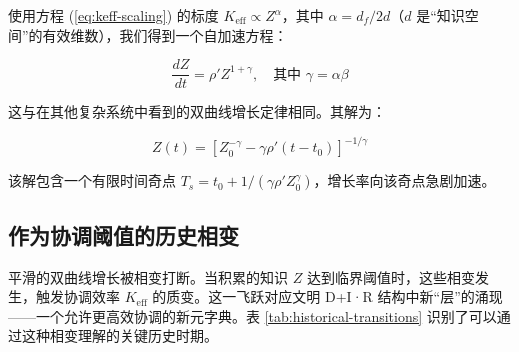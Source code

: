 \documentclass[12pt,a4paper]{article}
\theoremstyle{remark}
\newcommand{\df}{d_{\!f}}
\begin{document}
		使用方程 (\ref{eq:keff-scaling}) 的标度 $K_{\text{eff}} \propto Z^{\alpha}$，其中 $\alpha = \df/2d$（$d$ 是“知识空间”的有效维数），我们得到一个自加速方程：
		
		\begin{equation}
			\frac{dZ}{dt} = \rho' Z^{1+\gamma}, \quad \text{其中 } \gamma = \alpha \beta
			\label{eq:Z-self-accel}
		\end{equation}
		
		这与在其他复杂系统中看到的双曲线增长定律相同。其解为：
		
		\begin{equation}
			Z(t) = \left[ Z_0^{-\gamma} - \gamma \rho' (t - t_0) \right]^{-1/\gamma}
			\label{eq:Z-hyperbolic}
		\end{equation}
		
		该解包含一个有限时间奇点 $T_s = t_0 + 1/(\gamma \rho' Z_0^{\gamma})$，增长率向该奇点急剧加速。
		
		\subsection{作为协调阈值的历史相变}
		
		平滑的双曲线增长被相变打断。当积累的知识 $Z$ 达到临界阈值时，这些相变发生，触发协调效率 $K_{\text{eff}}$ 的质变。这一飞跃对应文明 D+I·R 结构中新“层”的涌现——一个允许更高效协调的新元字典。表 \ref{tab:historical-transitions} 识别了可以通过这种相变理解的关键历史时期。
		
\end{document}
